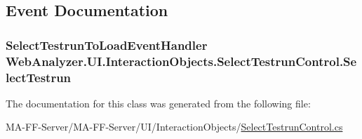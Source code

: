 \subsection{Event Documentation}
\hypertarget{class_web_analyzer_1_1_u_i_1_1_interaction_objects_1_1_select_testrun_control_add98c79fa38a7db09d583d84dbbce933}{}
\subsubsection[{Select\+Testrun}]{\setlength{\rightskip}{0pt plus 5cm}Select\+Testrun\+To\+Load\+Event\+Handler Web\+Analyzer.\+U\+I.\+Interaction\+Objects.\+Select\+Testrun\+Control.\+Select\+Testrun}\label{class_web_analyzer_1_1_u_i_1_1_interaction_objects_1_1_select_testrun_control_add98c79fa38a7db09d583d84dbbce933}


The documentation for this class was generated from the following file\+:\begin{DoxyCompactItemize}
\item 
M\+A-\/\+F\+F-\/\+Server/\+M\+A-\/\+F\+F-\/\+Server/\+U\+I/\+Interaction\+Objects/\hyperlink{_select_testrun_control_8cs}{Select\+Testrun\+Control.\+cs}\end{DoxyCompactItemize}
